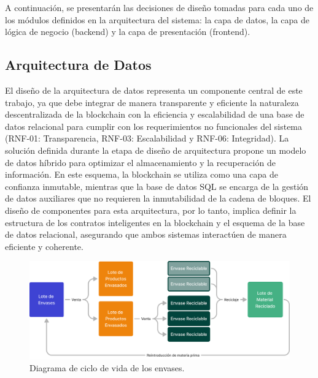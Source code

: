 A continuación, se presentarán las decisiones de diseño tomadas para cada uno de los módulos definidos en la arquitectura del sistema: la capa de datos, la capa de lógica de negocio (backend) y la capa de presentación (frontend).

\subsection{Arquitectura de Datos}

El diseño de la arquitectura de datos representa un componente central de este trabajo, ya que debe integrar de manera transparente y eficiente la naturaleza descentralizada de la blockchain con la eficiencia y escalabilidad de una base de datos relacional para cumplir con los requerimientos no funcionales del sistema (RNF-01: Transparencia, RNF-03: Escalabilidad y RNF-06: Integridad). La solución definida durante la etapa de diseño de arquitectura propone un modelo de datos híbrido para optimizar el almacenamiento y la recuperación de información. En este esquema, la blockchain se utiliza como una capa de confianza inmutable, mientras que la base de datos SQL se encarga de la gestión de datos auxiliares que no requieren la inmutabilidad de la cadena de bloques. El diseño de componentes para esta arquitectura, por lo tanto, implica definir la estructura de los contratos inteligentes en la blockchain y el esquema de la base de datos relacional, asegurando que ambos sistemas interactúen de manera eficiente y coherente.

\begin{figure}[!htb]
    \centering
    \includegraphics[width=\linewidth]{Figures/data-lifecycle.png}
    \caption{Diagrama de ciclo de vida de los envases.}
    \label{fig:data-lifecycle}
\end{figure}

